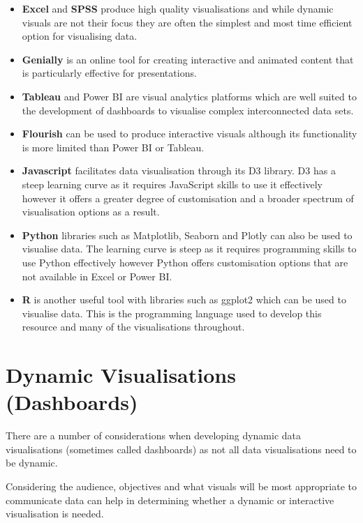 \documentclass[
]{book}
\providecommand{\tightlist}{%
  \setlength{\itemsep}{0pt}\setlength{\parskip}{0pt}}
\begin{document}
\begin{itemize}
\tightlist
\item
  \textbf{Excel} and \textbf{SPSS} produce high quality visualisations and while dynamic visuals are not their focus they are often the simplest and most time efficient option for visualising data.
\item
  \textbf{Genially} is an online tool for creating interactive and animated content that is particularly effective for presentations.
\item
  \textbf{Tableau} and Power BI are visual analytics platforms which are well suited to the development of dashboards to visualise complex interconnected data sets.
\item
  \textbf{Flourish} can be used to produce interactive visuals although its functionality is more limited than Power BI or Tableau.
\item
  \textbf{Javascript} facilitates data visualisation through its D3 library. D3 has a steep learning curve as it requires JavaScript skills to use it effectively however it offers a greater degree of customisation and a broader spectrum of visualisation options as a result.
\item
  \textbf{Python} libraries such as Matplotlib, Seaborn and Plotly can also be used to visualise data. The learning curve is steep as it requires programming skills to use Python effectively however Python offers customisation options that are not available in Excel or Power BI.
\item
  \textbf{R} is another useful tool with libraries such as ggplot2 which can be used to visualise data. This is the programming language used to develop this resource and many of the visualisations throughout.
\end{itemize}

\hypertarget{dynamic-visualisations-dashboards}{%
\section{Dynamic Visualisations (Dashboards)}\label{dynamic-visualisations-dashboards}}

There are a number of considerations when developing dynamic data visualisations (sometimes called dashboards) as not all data visualisations need to be dynamic.

Considering the audience, objectives and what visuals will be most appropriate to communicate data can help in determining whether a dynamic or interactive visualisation is needed.
\end{document}
